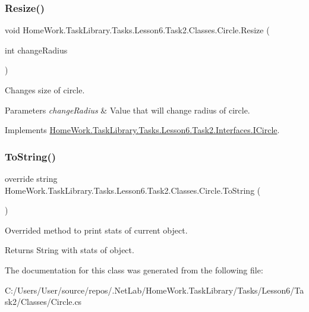 \subsubsection{\texorpdfstring{Resize()}{Resize()}}
{\footnotesize\ttfamily void Home\+Work.\+Task\+Library.\+Tasks.\+Lesson6.\+Task2.\+Classes.\+Circle.\+Resize (\begin{DoxyParamCaption}\item[{int}]{change\+Radius }\end{DoxyParamCaption})}



Changes size of circle. 


\begin{DoxyParams}{Parameters}
{\em change\+Radius} & Value that will change radius of circle.\\
\hline
\end{DoxyParams}


Implements \mbox{\hyperlink{interface_home_work_1_1_task_library_1_1_tasks_1_1_lesson6_1_1_task2_1_1_interfaces_1_1_i_circle_a8f8ddf2b20c4a64c9b107896ef72546c}{Home\+Work.\+Task\+Library.\+Tasks.\+Lesson6.\+Task2.\+Interfaces.\+I\+Circle}}.

\mbox{\label{class_home_work_1_1_task_library_1_1_tasks_1_1_lesson6_1_1_task2_1_1_classes_1_1_circle_a5ee66f1e8237be31374d570a19c7acdd}} 
\subsubsection{\texorpdfstring{ToString()}{ToString()}}
{\footnotesize\ttfamily override string Home\+Work.\+Task\+Library.\+Tasks.\+Lesson6.\+Task2.\+Classes.\+Circle.\+To\+String (\begin{DoxyParamCaption}{ }\end{DoxyParamCaption})}



Overrided method to print stats of current object. 

\begin{DoxyReturn}{Returns}
String with stats of object.
\end{DoxyReturn}


The documentation for this class was generated from the following file\+:\begin{DoxyCompactItemize}
\item 
C\+:/\+Users/\+User/source/repos/.\+Net\+Lab/\+Home\+Work.\+Task\+Library/\+Tasks/\+Lesson6/\+Task2/\+Classes/Circle.\+cs\end{DoxyCompactItemize}
